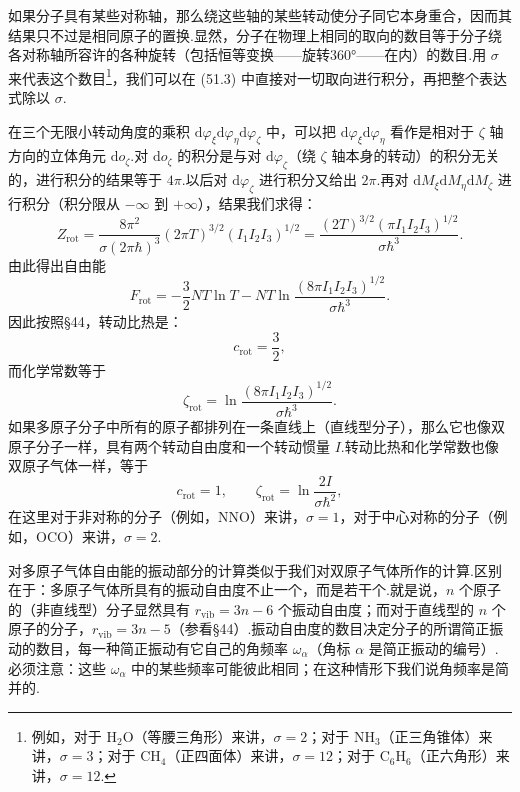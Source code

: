 如果分子具有某些对称轴，那么绕这些轴的某些转动使分子同它本身重合，因而其结果只不过是相同原子的置换.显然，分子在物理上相同的取向的数目等于分子绕各对称轴所容许的各种旋转（包括恒等变换——旋转360°——在内）的数目.用 $\sigma$ 来代表这个数目\footnote{例如，对于 $\mathrm{H}_2\mathrm{O}$（等腰三角形）来讲，$\sigma=2$；对于 $\mathrm{NH}_3$（正三角锥体）来讲，$\sigma=3$；对于 $\mathrm{CH}_4$（正四面体）来讲，$\sigma=12$；对于 $\mathrm{C}_6\mathrm{H}_6$（正六角形）来讲，$\sigma=12$.}，我们可以在 (51.3) 中直接对一切取向进行积分，再把整个表达式除以 $\sigma$.

在三个无限小转动角度的乘积 $\mathrm{d}\varphi_{\xi}\mathrm{d}\varphi_{\eta}\mathrm{d}\varphi_{\zeta}$ 中，可以把 $\mathrm{d}\varphi_{\xi}\mathrm{d}\varphi_{\eta}$ 看作是相对于 $\zeta$ 轴方向的立体角元 $\mathrm{d}o_{\zeta}$.对 $\mathrm{d}o_{\zeta}$ 的积分是与对 $\mathrm{d}\varphi_{\zeta}$（绕 $\zeta$ 轴本身的转动）的积分无关的，进行积分的结果等于 $4\pi$.以后对 $\mathrm{d}\varphi_{\zeta}$ 进行积分又给出 $2\pi$.再对 $\mathrm{d}M_{\xi}\mathrm{d}M_{\eta}\mathrm{d}M_{\zeta}$ 进行积分（积分限从 $-\infty$ 到 $+\infty$），结果我们求得：
\begin{equation*}
  Z_{\mathrm{rot}}=\frac{8\pi^2}{\sigma(2\pi\hbar)^3}(2\pi T)^{3/2}
  \left(I_1I_2I_3\right)^{1/2}
  =\frac{(2T)^{3/2}\left(\pi I_1I_2I_3\right)^{1/2}}{\sigma\hbar^3}.
\end{equation*}
由此得出自由能
\begin{equation}
  F_{\mathrm{rot}}=-\frac{3}{2}NT\ln T
  -NT\ln\frac{\left(8\pi I_1I_2I_3\right)^{1/2}}{\sigma\hbar^3}.
\end{equation}
因此按照§44，转动比热是：
\begin{equation}
  c_{\mathrm{rot}}=\frac{3}{2},
\end{equation}
而化学常数等于
\begin{equation}
  \zeta_{\mathrm{rot}}=\ln\frac{\left(8\pi I_1I_2I_3\right)^{1/2}}{\sigma\hbar^3}.
\end{equation}
如果多原子分子中所有的原子都排列在一条直线上（直线型分子），那么它也像双原子分子一样，具有两个转动自由度和一个转动惯量 $I$.转动比热和化学常数也像双原子气体一样，等于
\begin{equation}
  c_{\mathrm{rot}}=1,\qquad
  \zeta_{\mathrm{rot}}=\ln\frac{2I}{\sigma\hbar^2},
\end{equation}
在这里对于非对称的分子（例如，NNO）来讲，$\sigma=1$，对于中心对称的分子（例如，OCO）来讲，$\sigma=2$.

对多原子气体自由能的振动部分的计算类似于我们对双原子气体所作的计算.区别在于：多原子气体所具有的振动自由度不止一个，而是若干个.就是说，$n$ 个原子的（非直线型）分子显然具有 $r_{\mathrm{vib}}=3n-6$ 个振动自由度；而对于直线型的 $n$ 个原子的分子，$r_{\mathrm{vib}}=3n-5$（参看§44）.振动自由度的数目决定分子的所谓简正振动的数目，每一种简正振动有它自己的角频率 $\omega_{\alpha}$（角标 $\alpha$ 是简正振动的编号）.必须注意：这些 $\omega_{\alpha}$ 中的某些频率可能彼此相同；在这种情形下我们说角频率是简并的.

